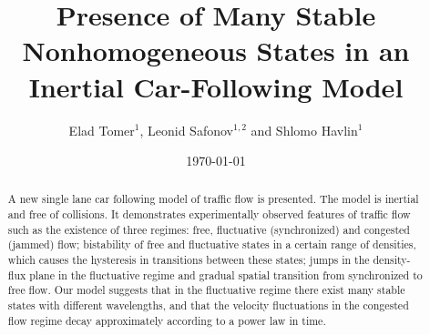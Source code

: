 
%
%
%
%
%
%

\newcommand{\be}{\begin{equation}}
\newcommand{\en}{\end{equation}}
\newcommand{\bea}{\begin{eqnarray}}
\newcommand{\ena}{\end{eqnarray}}



\draft


\title{Presence of Many Stable Nonhomogeneous States in 
an Inertial Car-Following Model}   

\author{Elad Tomer$^1$, Leonid Safonov$^{1,2}$ and Shlomo Havlin$^1$}
\address{$^1$ Minerva Center and Department of Physics,
         Bar--Ilan~University,
         52900~Ramat--Gan, Israel}
\address{$^2$ Department of Applied Mathematics and Mechanics, Voronezh State
University, 394693~Voronezh, Russia}

\date{\today}

\maketitle

\begin{abstract}


A new single lane car following model of traffic flow is presented. The model 
is inertial and free of collisions. It demonstrates experimentally observed 
features of traffic flow such as the existence of three regimes: free,
fluctuative (synchronized) and congested (jammed) flow; bistability of free
and fluctuative states in a certain range of densities, which causes the
hysteresis in transitions between these states; jumps in the density-flux
plane  in the fluctuative regime and gradual spatial transition from
synchronized to free flow. Our model suggests that in the fluctuative
regime there exist  many stable states with different wavelengths, and that
the velocity fluctuations in the congested flow regime decay approximately
according to a power law in time. 


\end{abstract}


